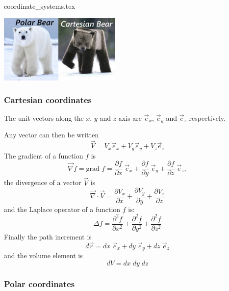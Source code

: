 \begin{flushright} {\tiny {\color{gray} coordinate\_systems.tex}} \end{flushright}

\begin{center}
\includegraphics[width=6cm]{images/polarbear}
\end{center}

\subsubsection{Cartesian coordinates}

The unit vectors along the $x$, $y$ and $z$ axis are 
$\vec{e}_x$, $\vec{e}_y$ and $\vec{e}_z$ respectively.



\noindent Any vector can then be written
\[
{\vec V}  = V_x {\vec e}_x  + V_y {\vec e}_y + V_z \vec{e}_z
\]
The gradient of a function $f$ is 
\[
\vec{\nabla} f= \text{grad }f= 
\frac{\partial f}{\partial x}\; \vec{e}_x +
\frac{\partial f}{\partial y}\; \vec{e}_y +
\frac{\partial f}{\partial z}\; \vec{e}_z,
\]
the divergence of a vector $\vec{V}$ is
\[
\vec{\nabla}\cdot \vec{V} = 
\frac{\partial V_x}{\partial x}+
\frac{\partial V_y}{\partial y}+
\frac{\partial V_z}{\partial z}
\]
and the Laplace operator of a function $f$ is:
\[
\Delta f = 
\frac{\partial^2 f}{\partial x^2} + 
\frac{\partial^2 f}{\partial y^2} + 
\frac{\partial^2 f}{\partial z^2}  
\]
Finally the path increment is
\[
d\vec{r} = dx \; {\vec e}_x  + dy\; {\vec e}_y + dz \; \vec{e}_z
\]
and the volume element is 
\[
dV=dx\; dy \; dz
\]

\subsubsection{Polar coordinates}

